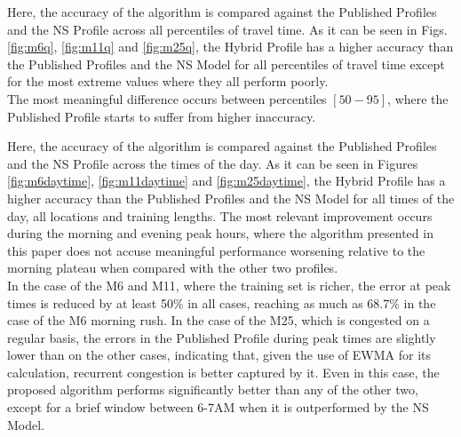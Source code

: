 \documentclass[letterpaper, 10 pt, conference]{ieeeconf}  %
\begin{document}
Here, the accuracy of the algorithm is compared against the Published Profiles and the NS Profile across all percentiles of travel time.
As it can be seen in Figs. \ref{fig:m6q}, \ref{fig:m11q} and \ref{fig:m25q}, the Hybrid Profile has a higher accuracy than the Published Profiles and the NS Model for all percentiles of travel time except for the most extreme values where they all perform poorly.\\
The most meaningful difference occurs between percentiles $[50-95]$, where the Published Profile starts to suffer from higher inaccuracy.




Here, the accuracy of the algorithm is compared against the Published Profiles and the NS Profile across the times of the day.
As it can be seen in Figures \ref{fig:m6daytime}, \ref{fig:m11daytime} and \ref{fig:m25daytime}, the Hybrid Profile has a higher accuracy than the Published Profiles and the NS Model for all times of the day, all locations and training lengths. 
The most relevant improvement occurs during the morning and evening peak hours, where the algorithm presented in this paper does not accuse meaningful performance worsening relative to the morning plateau when compared with the other two profiles.\\
In the case of the M6 and M11, where the training set is richer, the error at peak times is reduced by at least 50\% in all cases, reaching as much as 68.7\% in the case of the M6 morning rush.
In the case of the M25, which is congested on a regular basis, the errors in the Published Profile during peak times are slightly lower than on the other cases, indicating that, given the use of EWMA for its calculation, recurrent congestion is better captured by it. 
Even in this case, the proposed algorithm performs significantly better than any of the other two, except for a brief window between 6-7AM when it is outperformed by the NS Model.
\end{document}
